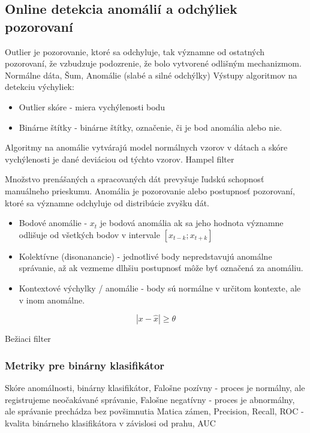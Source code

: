 \subsection{Online detekcia anomálií a odchýliek pozorovaní}
Outlier je pozorovanie, ktoré sa odchyluje, tak významne od ostatných pozorovaní, že vzbudzuje
podozrenie, že bolo vytvorené odlišným mechanizmom. Normálne dáta, Šum, Anomálie (slabé a silné odchýlky)
Výstupy algoritmov na detekciu výchyliek: 
\begin{itemize}
\itemsep0pt
\item Outlier skóre - miera vychýlenosti bodu
\item Binárne štítky - binárne štítky, označenie, či je bod anomália alebo nie.
\end{itemize}
Algoritmy na anomálie vytvárajú model normálnych vzorov v dátach a skóre vychýlenosti je dané deviáciou od týchto vzorov.
\cite{outlier-analysis} 
Hampel filter

\cite{survey-univariate-time-series} 
Množstvo prenášaných a spracovaných dát prevyšuje ľudskú schopnosť manuálneho prieskumu. Anomália je pozorovanie alebo postupnosť pozorovaní, ktoré sa významne odchyluje od distribúcie zvyšku dát. 
\begin{itemize}
	\item Bodové anomálie - $x_t$ je bodová anomália ak sa jeho hodnota významne odlišuje od všetkých 		
		bodov v intervale $ [x_{t-k}; x_{t+k}] $
	\item Kolektívne (disonanancie) - jednotlivé body nepredstavujú anomálne správanie, až ak vezmeme dlhšiu postupnosť môže byť označená za anomáliu.
	\item Kontextové výchylky / anomálie - body sú normálne v určitom kontexte, ale v inom anomálne.
\end{itemize}		

\cite{review-outlier-datection} \cite{anomaly-detection-algorithms}
\begin{equation}
|x - \hat{x}| \geq \theta 
\end{equation}

Bežiaci filter  
\cite{anomaly-detection-models}

\subsubsection{Metriky pre binárny klasifikátor}
Skóre anomálnosti, 	binárny klasifikátor, 
Falošne pozívny - proces je normálny, ale registrujeme neočakávané správanie, 
Falošne negatívny - proces je abnormálny, ale správanie prechádza bez povšimnutia
Matica zámen, Precision, Recall, 
ROC - kvalita binárneho klasifikátora v závislosi od prahu, AUC
\cite{wsn-outlier-detection-survey}


